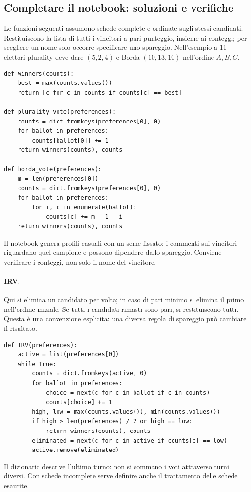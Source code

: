\subsection{Completare il notebook: soluzioni e verifiche}
Le funzioni seguenti assumono schede complete e ordinate sugli stessi candidati. Restituiscono la lista di tutti i vincitori a pari punteggio, insieme ai conteggi; per scegliere un nome solo occorre specificare uno spareggio. Nell'esempio a 11 elettori plurality deve dare $(5,2,4)$ e Borda $(10,13,10)$ nell'ordine $A,B,C$.
\begin{lstlisting}
def winners(counts):
    best = max(counts.values())
    return [c for c in counts if counts[c] == best]

def plurality_vote(preferences):
    counts = dict.fromkeys(preferences[0], 0)
    for ballot in preferences:
        counts[ballot[0]] += 1
    return winners(counts), counts

def borda_vote(preferences):
    m = len(preferences[0])
    counts = dict.fromkeys(preferences[0], 0)
    for ballot in preferences:
        for i, c in enumerate(ballot):
            counts[c] += m - 1 - i
    return winners(counts), counts
\end{lstlisting}
Il notebook genera profili casuali con un seme fissato: i commenti sui vincitori riguardano quel campione e possono dipendere dallo spareggio. Conviene verificare i conteggi, non solo il nome del vincitore.

\paragraph{IRV.} Qui si elimina un candidato per volta; in caso di pari minimo si elimina il primo nell'ordine iniziale. Se tutti i candidati rimasti sono pari, si restituiscono tutti. Questa è una convenzione esplicita: una diversa regola di spareggio può cambiare il risultato.
\begin{lstlisting}
def IRV(preferences):
    active = list(preferences[0])
    while True:
        counts = dict.fromkeys(active, 0)
        for ballot in preferences:
            choice = next(c for c in ballot if c in counts)
            counts[choice] += 1
        high, low = max(counts.values()), min(counts.values())
        if high > len(preferences) / 2 or high == low:
            return winners(counts), counts
        eliminated = next(c for c in active if counts[c] == low)
        active.remove(eliminated)
\end{lstlisting}
Il dizionario descrive l'ultimo turno: non si sommano i voti attraverso turni diversi. Con schede incomplete serve definire anche il trattamento delle schede esaurite.

